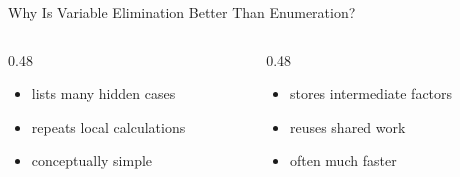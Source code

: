 \documentclass[aspectratio=169]{beamer}
\begin{document}
\begin{frame}{Why Is Variable Elimination Better Than Enumeration?}
\begin{columns}[T,onlytextwidth]
  \begin{column}{0.48\textwidth}
    \begin{tcolorbox}[colback=questionbg,colframe=questionframe,boxrule=0.7pt,title=Enumeration]
    \begin{itemize}
      \item lists many hidden cases
      \item repeats local calculations
      \item conceptually simple
    \end{itemize}
    \end{tcolorbox}
  \end{column}
  \begin{column}{0.48\textwidth}
    \begin{tcolorbox}[colback=plainbg,colframe=plainframe,boxrule=0.7pt,title=Variable elimination]
    \begin{itemize}
      \item stores intermediate factors
      \item reuses shared work
      \item often much faster
    \end{itemize}
    \end{tcolorbox}
  \end{column}
\end{columns}
\end{frame}
\end{document}
